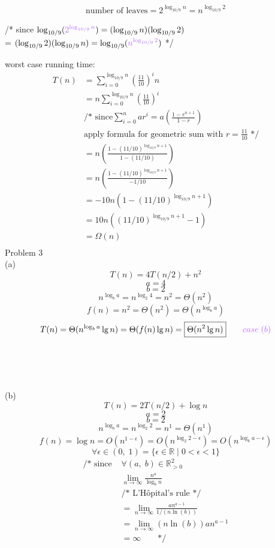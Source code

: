 \documentclass[12pt,border=4pt,multi]{article}%
\begin{document}
\begin{align*}
\text{number of leaves} = 2^{\log_{10/9} n} = n^{\log_{10/9} 2}
\end{align*}
\begin{center}
/* since $\log_{10/9}(\textcolor{orchid}{2^{\log_{10/9} n}}) = (\log_{10/9} n)(\log_{10/9} 2)$\\
= $(\log_{10/9} 2)(\log_{10/9} n) = \log_{10/9} (\textcolor{orchid}{n^{\log_{10/9} 2}})$ */
\end{center}
worst case running time:
\begin{align*}
T(n) &= \boxed{\sum_{i = 0}^{\log_{10/9} n} \left(\frac{11}{10}\right)^i n}\\
&= n\sum_{i = 0}^{\log_{10/9} n} \left(\frac{11}{10}\right)^i\\
&\text{/* since} \sum_{i = 0}^n ar^i = a\left(\frac{1 - r^{n + 1}}{1 - r}\right)\\
&\text{apply formula for geometric sum with $r = \frac{11}{10}$ */}\\
&= n\left(\frac{1 - (11/10)^{\log_{10/9} n + 1}}{1 - (11/10)}\right)\\
&= n\left(\frac{1 - (11/10)^{\log_{10/9} n + 1}}{- 1/10}\right)\\
&= -10n(1 - (11/10)^{\log_{10/9} n + 1})\\
&= 10n((11/10)^{\log_{10/9} n + 1} - 1)\\
&= \boxed{\Omega(n)}\\
\end{align*}
\newpage
\noindent
Problem 3\\
(a)
\[T(n) = 4T(n / 2) + n^2\]
\[a = 4\]
\[b = 2\]
\[n^{\log_b a} = n^{\log_2 4} = n^2 = \Theta(n^2)\]
\[f(n) = n^2 = \Theta(n^2) = \Theta(n^{\log_b a})\]
\[T(n) = \Theta(n^{\log_b a} \lg n) = \Theta(f(n) \lg n) = \boxed{\Theta(n^2 \lg n)} \qquad \textcolor{orchid}{case\;(b)}\]
\\
\\
\\
\\
(b)
\[T(n) = 2T(n / 2) + \log n\]
\[a = 2\]
\[b = 2\]
\[n^{\log_b a} = n^{\log_2 2} = n^1 = \Theta(n^1)\]
\[f(n) = \log n = O(n^{1 - \epsilon}) = O(n^{\log_2 2 - \epsilon}) = O(n^{\log_b a - \epsilon})\]
\[\forall \epsilon \in (0,\;1) = \{\epsilon \in \mathbb{R}\;|\;0 < \epsilon < 1\}\]
\begin{align*}
\text{/* since } &\forall (a,\; b) \in \mathbb{R}_{>0}^2\\
&\lim_{n \rightarrow \infty} \frac{n^a}{\log_b n}\\ 
&\text{/* L'Hôpital's rule */}\\
&= \lim_{n \rightarrow \infty} \frac{a n^{a - 1}}{1 / (n \ln (b))}\\
&= \lim_{n \rightarrow \infty} (n \ln (b))a n^{a - 1}\\
&= \infty \qquad \text{*/}
\end{align*}
\end{document}
